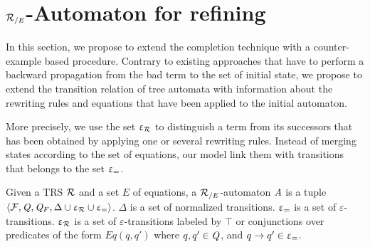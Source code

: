 \section{$\RE$-Automaton for refining}
\label{sec:re-automaton}


In this section, we propose to extend the completion technique with a
counter-example based procedure. Contrary to existing approaches that
have to perform a backward propagation from the bad term to the set of
initial state, we propose to extend the transition relation of tree
automata with information about the rewriting rules and equations that
have been applied to the initial automaton.

More precisely, we use the set $\upvarepsilon_{\mathcal R}$ to distinguish a term
from its successors that has been obtained by applying one or several
rewriting rules. Instead of merging states according to the set of
equations, our model link them with transitions that belongs to the
set $\upvarepsilon_{=}$.




\begin{definition}[$\RE$-automaton]
  \label{def:re-automaton}
  Given a TRS $\mathcal R$ and a set $E$ of equations, a $\RE$-automaton $\mathit A$
  is a tuple $\langle \F, \Q, \Q_F, %
  \Delta \cup \Drw \cup \Deq\rangle$.  $\Delta$ is a set of normalized
  transitions. $\upvarepsilon_{=}$ is a set of $\varepsilon$-transitions. $\upvarepsilon_{\mathcal R}$ is
  a set of $\varepsilon$-transitions labeled by $\top$ or conjunctions 
  over predicates of the form $Eq(q, q')$ where $q, q' \in \mathit Q$, and $q \rightarrow
  q' \in \upvarepsilon_{=}$. %
\end{definition}







